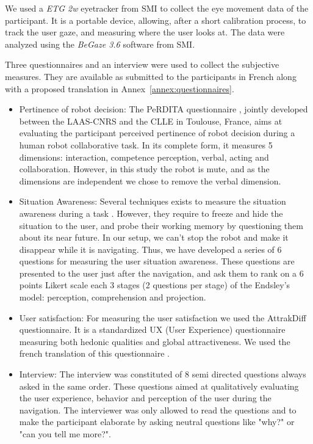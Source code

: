 \documentclass[a4paper,11pt,twoside]{StyleThese}
\begin{document}
We used a \textit{ETG 2w} eyetracker from SMI to collect the eye movement data of the participant. It is a portable device, allowing, after a short calibration process, to track the user gaze, and measuring where the user looks at. The data were analyzed using the \textit{BeGaze 3.6} software from SMI.

Three questionnaires and an interview were used to collect the subjective measures. They are available as submitted to the participants in French along with a proposed translation in Annex~\ref{annex:questionnaires}.
\begin{itemize}
\item Pertinence of robot decision: The PeRDITA questionnaire \cite{devin_evaluating_2018}, jointly developed between the LAAS-CNRS and the CLLE in Toulouse, France, aims at evaluating the participant perceived pertinence of robot decision during a human robot collaborative task. In its complete form, it measures 5 dimensions: interaction, competence perception, verbal, acting and collaboration. However, in this study the robot is mute, and as the dimensions are independent we chose to remove the verbal dimension.
\item Situation Awareness: Several techniques exists to measure the situation awareness during a task \cite{endsley_design_1988}. However, they require to freeze and hide the situation to the user, and probe their working memory by questioning them about its near future. In our setup, we can't stop the robot and make it disappear while it is navigating. Thus, we have developed a series of 6 questions for measuring the user situation awareness. These questions are presented to the user just after the navigation, and ask them to rank on a 6 points Likert scale each 3 stages (2 questions per stage) of the Endsley's model: perception, comprehension and projection.
\item User satisfaction: For measuring the user satisfaction we used the AttrakDiff questionnaire. It is a standardized UX (User Experience) questionnaire measuring both hedonic qualities and global attractiveness. We used the french translation of this questionnaire \cite{lallemand_creation_2015}.
\item Interview: The interview was constituted of 8 semi directed questions always asked in the same order. These questions aimed at qualitatively evaluating the user experience, behavior and perception of the user during the navigation. The interviewer was only allowed to read the questions and to make the participant elaborate by asking neutral questions like "why?" or "can you tell me more?".
\end{itemize}
\end{document}
